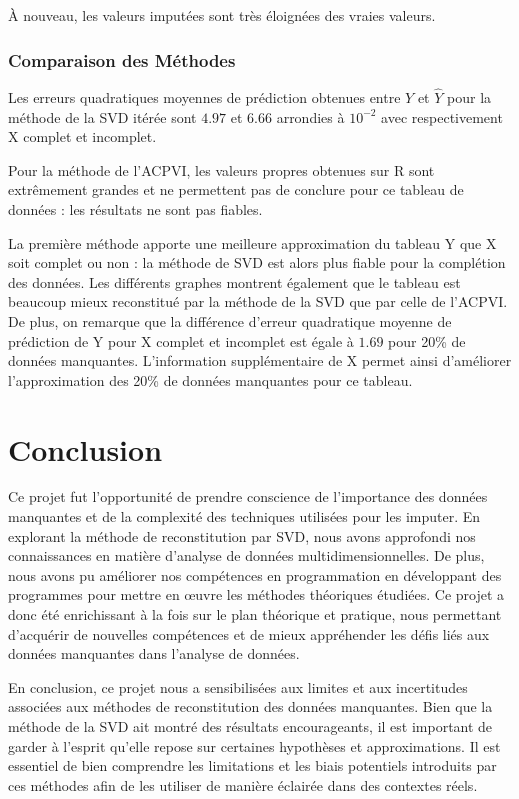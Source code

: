 \documentclass[12pt, openany, fleqn, french]{article}
\begin{document}
À nouveau, les valeurs imputées sont très éloignées des vraies valeurs.

\subsubsection{Comparaison des Méthodes}

Les erreurs quadratiques moyennes de prédiction obtenues entre $Y$ et $\hat{Y}$ pour la méthode de la SVD itérée sont $4.97$ et $6.66$ arrondies à $10^{-2}$ avec respectivement X complet et incomplet. 

Pour la méthode de l'ACPVI, les valeurs propres obtenues sur R sont extrêmement grandes et ne permettent pas de conclure pour ce tableau de données : les résultats ne sont pas fiables.

La première méthode apporte une meilleure approximation du tableau Y que X soit complet ou non : la méthode de SVD est alors plus fiable pour la complétion des données. Les différents graphes montrent également que le tableau est beaucoup mieux reconstitué par la méthode de la SVD que par celle de l'ACPVI. De plus, on remarque que la différence d'erreur quadratique moyenne de prédiction de Y pour X complet et incomplet est égale à $1.69$ pour 20\% de données manquantes. L'information supplémentaire de X permet ainsi d'améliorer l'approximation des 20\% de données manquantes pour ce tableau.

\section{Conclusion}

Ce projet fut l'opportunité de prendre conscience de l'importance des données manquantes et de la complexité des techniques utilisées pour les imputer. En explorant la méthode de reconstitution par SVD, nous avons approfondi nos connaissances en matière d'analyse de données multidimensionnelles. De plus, nous avons pu améliorer nos compétences en programmation en développant des programmes pour mettre en œuvre les méthodes théoriques étudiées. Ce projet a donc été enrichissant à la fois sur le plan théorique et pratique, nous permettant d'acquérir de nouvelles compétences et de mieux appréhender les défis liés aux données manquantes dans l'analyse de données.


En conclusion, ce projet nous a sensibilisées aux limites et aux incertitudes associées aux méthodes de reconstitution des données manquantes. Bien que la méthode de la SVD ait montré des résultats encourageants, il est important de garder à l'esprit qu'elle repose sur certaines hypothèses et approximations. Il est essentiel de bien comprendre les limitations et les biais potentiels introduits par ces méthodes afin de les utiliser de manière éclairée dans des contextes réels.
\end{document}
